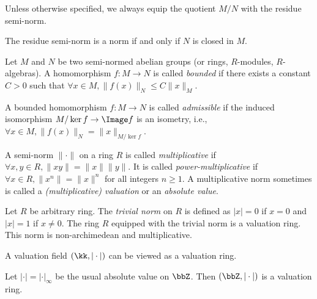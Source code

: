     Unless otherwise specified, we always equip the quotient \(M/N\) with the residue semi-norm.

    \begin{remark}\label{rmk:residue_semi-norm_is_a_norm_iff_N_is_closed}
        The residue semi-norm is a norm if and only if \(N\) is closed in \(M\).
    \end{remark}

    \begin{definition}\label{def:bounded_and_admissible_homomorphism}
        Let \(M\) and \(N\) be two semi-normed abelian groups (or rings, \(R\)-modules, \(R\)-algebras).
        A homomorphism \(f: M \to N\) is called \emph{bounded} if there exists a constant \(C > 0\) such that \(\forall x \in M, \|f(x)\|_N \leq C\|x\|_M\).
        
        A bounded homomorphism \(f: M \to N\) is called \emph{admissible} if the induced isomorphism \(M/\ker f \to \Image f\) is an isometry, i.e., \(\forall x \in M, \|f(x)\|_N = \|x\|_{M/\ker f}\).
    \end{definition}

    \begin{definition}\label{def:multiplicative_and_power_multiplicative_semi-norm}
        A semi-norm \(\|\cdot\|\) on a ring \(R\) is called \emph{multiplicative} if \(\forall x,y \in R, \|xy\| = \|x\|\|y\|\).
        It is called \emph{power-multiplicative} if \(\forall x \in R, \|x^n\| = \|x\|^n\) for all integers \(n \geq 1\).
        A multiplicative norm sometimes is called a \emph{(multiplicative) valuation} or an \emph{absolute value}.
    \end{definition}

    \begin{example}\label{eg:trivial_normed_rings}
        Let \(R\) be arbitrary ring.
        The \emph{trivial norm} on \(R\) is defined as \(|x| = 0\) if \(x = 0\) and \(|x| = 1\) if \(x \neq 0\).
        The ring \(R\) equipped with the trivial norm is a valuation ring.
        This norm is non-archimedean and multiplicative.
    \end{example}

    \begin{example}\label{eg:valuation_rings_as_normed_rings}
        A valuation field \((\kk, |\cdot|)\) can be viewed as a valuation ring.
    \end{example}

    \begin{example}\label{eg:Z_with_usual_absolute_value_as_normed_rings}
        Let \(|\cdot| = |\cdot|_{\infty}\) be the usual absolute value on \(\bbZ\).
        Then \((\bbZ, |\cdot|)\) is a valuation ring.
    \end{example}

